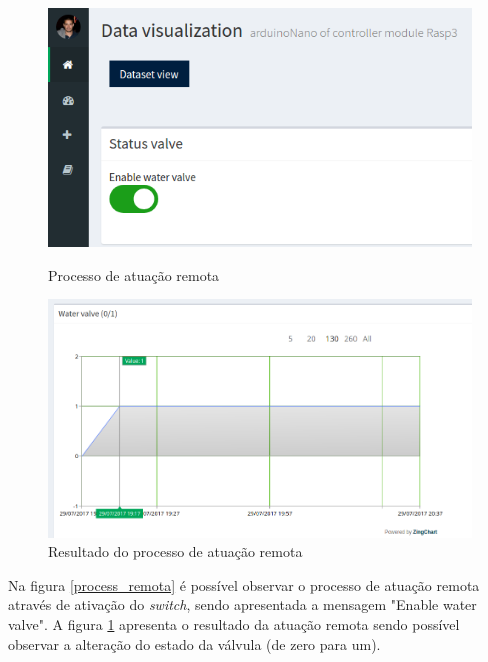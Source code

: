 \begin{figure}[h]
	\centering
	\begin{minipage}[b]{0.495\textwidth}
		\centering
		\includegraphics[width=\textwidth]{prints-web/onstatus.png}
		\caption{Processo de atuação remota \newline}
		\label{process_remota}
	\end{minipage}
	\hfill
	\begin{minipage}[b]{0.495\textwidth}
		\centering
		\includegraphics[width=\textwidth]{prints-web/viewstatus.png}
		\caption{Resultado do processo de atuação remota}
		\label{resutl_remota}
	\end{minipage}
\end{figure}


Na figura \ref{process_remota} é possível observar o processo de atuação remota através de ativação do \textit{switch}, sendo apresentada a mensagem "Enable water valve". A figura \ref{resutl_remota} apresenta o resultado da atuação remota sendo possível observar a alteração do estado da válvula (de zero para um).  

